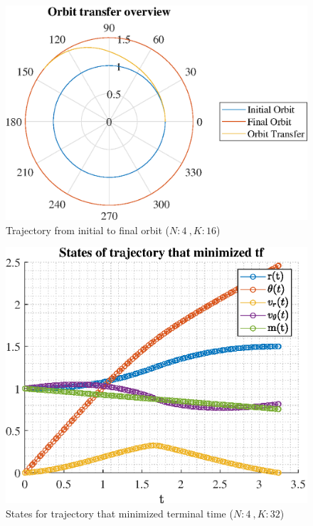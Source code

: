 \documentclass[]{article}
\begin{document}
	\begin{figure}
		\centering
		\includegraphics[scale=0.75]{orbit_N4_K16_C3_tf.eps}
		\caption{Trajectory from initial to final orbit (\(N:4\ , K:16\))}
		\label{fig:orbit_N4_K16_C3_tf}
	\end{figure}
	\begin{figure}
		\centering
		\includegraphics[scale=0.75]{states_N4_K32_C3_tf.eps}
		\caption{States for trajectory that minimized terminal time (\(N:4\ , K:32\))}
		\label{fig:states_N4_K32_C3_tf}
	\end{figure}
\end{document}
